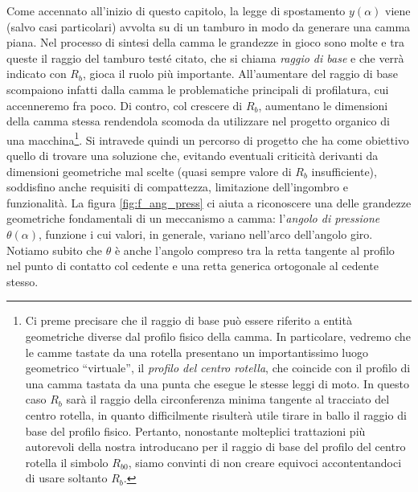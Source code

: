 \noindent Come accennato all'inizio di questo capitolo, la legge di spostamento
$y(\alpha)$ 
viene (salvo casi particolari) avvolta su di un tamburo in modo da generare
una camma piana.
Nel processo di sintesi della camma le grandezze  in gioco sono molte e tra
queste il raggio del tamburo test\'e citato, che si chiama {\em raggio di base} e che verr\`a indicato con $R_b$, gioca il  ruolo pi\`u importante.
All'aumentare del raggio di base scompaiono infatti dalla
camma le problematiche principali di profilatura,
cui accenneremo fra poco.  Di contro,  col crescere di $R_b$,
aumentano le dimensioni della camma stessa rendendola 
scomoda da utilizzare nel progetto organico di una macchina\footnote{Ci preme
precisare 
che il raggio di base pu\`o essere riferito a entit\`a geometriche diverse
dal profilo fisico della camma. In particolare, vedremo che le camme tastate
da una rotella presentano un importantissimo luogo geometrico ``virtuale'', il
{\em profilo del
centro rotella}, che coincide con il profilo di una camma tastata da una punta che esegue le stesse leggi di moto.
In questo caso $R_b$ sar\`a il raggio della circonferenza minima
tangente al tracciato del centro rotella, in quanto difficilmente
risulter\`a utile tirare in ballo il raggio di base del profilo fisico.
Pertanto, nonostante
molteplici trattazioni pi\`u autorevoli della nostra introducano per
il raggio di base del profilo del centro rotella  il simbolo $R_{b0}$, siamo convinti
di non creare equivoci accontentandoci di usare soltanto $R_b$.
}.
Si intravede quindi un percorso di progetto 
che ha come obiettivo quello di trovare una soluzione
che, evitando eventuali criticit\`a 
derivanti da dimensioni geometriche mal scelte (quasi sempre
valore di $R_b$ insufficiente),
soddisfino anche requisiti di compattezza, limitazione
dell'ingombro
 e funzionalit\`a.
La figura \ref{fig:f_ang_press} ci aiuta a riconoscere una delle grandezze
geometriche 
fondamentali di un meccanismo a camma: l'{\em angolo di pressione} $\theta(
\alpha)$, funzione i cui valori, in generale,
variano nell'arco dell'angolo giro.
Notiamo subito che $\theta$ \`e anche l'angolo compreso tra la retta tangente al
profilo nel punto di contatto col cedente e una retta generica
ortogonale al cedente stesso. 
